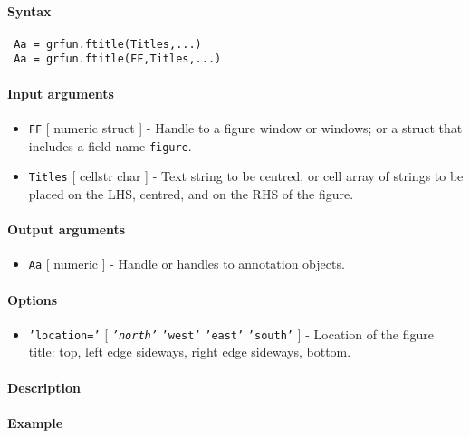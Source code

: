 


	\paragraph{Syntax}
 
 \begin{verbatim}
 Aa = grfun.ftitle(Titles,...)
 Aa = grfun.ftitle(FF,Titles,...)
 \end{verbatim}
 
 \paragraph{Input arguments}
 
 \begin{itemize}
 \item
   \texttt{FF} {[} numeric \textbar{} struct {]} - Handle to a figure
   window or windows; or a struct that includes a field name
   \texttt{figure}.
 \item
   \texttt{Titles} {[} cellstr \textbar{} char {]} - Text string to be
   centred, or cell array of strings to be placed on the LHS, centred,
   and on the RHS of the figure.
 \end{itemize}
 
 \paragraph{Output arguments}
 
 \begin{itemize}
 \item
   \texttt{Aa} {[} numeric {]} - Handle or handles to annotation objects.
 \end{itemize}
 
 \paragraph{Options}
 
 \begin{itemize}
 \item
   \texttt{'location='} {[} \emph{\texttt{'north'}} \textbar{}
   \texttt{'west'} \textbar{} \texttt{'east'} \textbar{} \texttt{'south'}
   {]} - Location of the figure title: top, left edge sideways, right
   edge sideways, bottom.
 \end{itemize}
 
 \paragraph{Description}
 
 \paragraph{Example}


